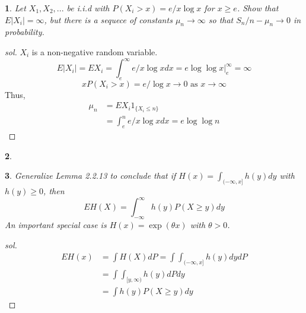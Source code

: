 \documentclass{report}
\newtheorem{ex}{}[section]
\begin{document}
\begin{ex}
Let $X_1,X_2,...$ be i.i.d with $P(X_i > x) = e/x\log x$ for $x \ge e$. Show that $E|X_i| = \infty$, but there is a sequece of constants $\mu_n \to \infty$ so that $S_n/n - \mu_n \to 0$ in probability.
\end{ex}
\begin{proof}[sol]
$X_i$ is a non-negative random variable.
\[E|X_i| = EX_i = \int_e^\infty e/x\log xdx = e\log\log x|^\infty_e = \infty\]
\[xP(X_i > x) = e/\log x \to 0 \text{ as } x \to \infty\]
Thus,
\begin{align*}
    \mu_n &= EX_i1_{\{X_i \le n\}}\\
    &=\int_e^n e/x\log xdx = e\log\log n
\end{align*}
\end{proof}
\begin{ex}
\end{ex}
\begin{ex}
Generalize Lemma 2.2.13 to conclude that if $H(x) = \int_{(-\infty, x]} h(y)dy$ with $h(y) \ge 0$, then
\[EH(X) = \int_{-\infty}^\infty h(y)P(X \ge y)dy\]
An important special case is $H(x) = \exp (\theta x)$ with $\theta >0$.
\end{ex}
\begin{proof}[sol]
\begin{align*}
    EH(x) &= \int H(X)dP = \int\int_{(-\infty, x]} h(y)dydP\\
    &= \int\int_{[y,\infty)}h(y)dPdy\\
    &= \int h(y)P(X \ge y)dy
\end{align*}
\end{proof}
\end{document}
